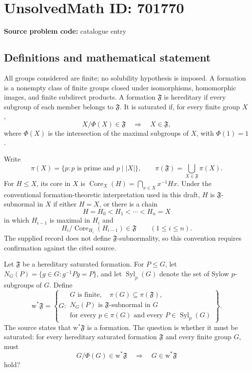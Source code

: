 \documentclass[11pt]{article}
\begin{document}
\section*{UnsolvedMath ID: 701770}
\textbf{Source problem code:} catalogue entry
\subsection{Definitions and mathematical statement}
All groups considered are finite; no solubility hypothesis is imposed. A formation is a nonempty class of finite groups closed under isomorphisms, homomorphic images, and finite subdirect products. A formation \(\mathfrak F\) is hereditary if every subgroup of each member belongs to \(\mathfrak F\). It is saturated if, for every finite group \(X\),
\[
X/\Phi(X)\in\mathfrak F\quad\Longrightarrow\quad X\in\mathfrak F,
\]
where \(\Phi(X)\) is the intersection of the maximal subgroups of \(X\), with \(\Phi(1)=1\).

Write
\[
\pi(X)=\{p:p\text{ is prime and }p\mid |X|\},\qquad
\pi(\mathfrak F)=\bigcup_{X\in\mathfrak F}\pi(X).
\]
For \(H\leq X\), its core in \(X\) is \(\operatorname{Core}_X(H)=\bigcap_{x\in X}x^{-1}Hx\). Under the conventional formation-theoretic interpretation used in this draft, \(H\) is \(\mathfrak F\)-subnormal in \(X\) if either \(H=X\), or there is a chain
\[
H=H_0<H_1<\cdots<H_n=X
\]
in which \(H_{i-1}\) is maximal in \(H_i\) and
\[
H_i/\operatorname{Core}_{H_i}(H_{i-1})\in\mathfrak F
\qquad(1\leq i\leq n).
\]
The supplied record does not define \(\mathfrak F\)-subnormality, so this convention requires confirmation against the cited source.

Let \(\mathfrak F\) be a hereditary saturated formation. For \(P\leq G\), let \(N_G(P)=\{g\in G:g^{-1}Pg=P\}\), and let \(\operatorname{Syl}_p(G)\) denote the set of Sylow \(p\)-subgroups of \(G\). Define
\[
\mathrm{w}^{*}\mathfrak F=
\left\{G:\begin{array}{l}
G\text{ is finite},\quad \pi(G)\subseteq\pi(\mathfrak F),\\
N_G(P)\text{ is }\mathfrak F\text{-subnormal in }G\\
\text{for every }p\in\pi(G)\text{ and every }P\in\operatorname{Syl}_p(G)
\end{array}\right\}.
\]
The source states that \(\mathrm{w}^{*}\mathfrak F\) is a formation. The question is whether it must be saturated: for every hereditary saturated formation \(\mathfrak F\) and every finite group \(G\), must
\[
G/\Phi(G)\in\mathrm{w}^{*}\mathfrak F
\quad\Longrightarrow\quad
G\in\mathrm{w}^{*}\mathfrak F
\]
hold?
\end{document}
